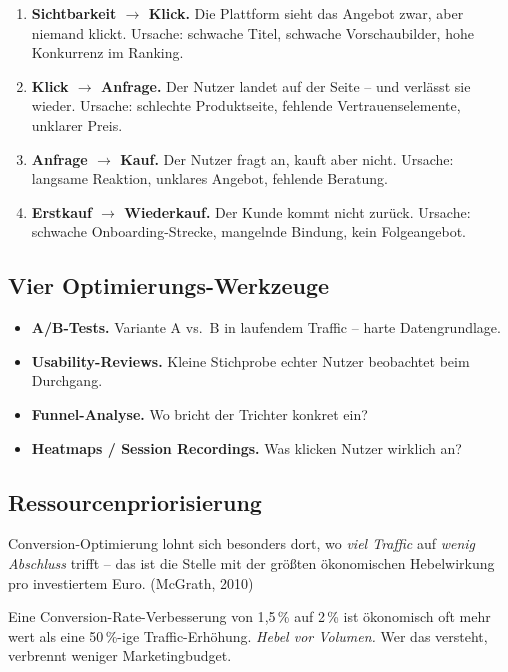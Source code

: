 \documentclass[11pt,a4paper,oneside]{article}
\newcommand{\caveatfontfallback}{\itshape}
\newcommand\caveatfont{\caveatfontfallback}%
\newcommand{\akzent}[1]{{\caveatfont\color{lpAmber}#1}}
\newcommand{\quelle}[1]{{\footnotesize\color{lpGray}(#1)}}
\begin{document}
\begin{enumerate}
  \item \textbf{Sichtbarkeit $\rightarrow$ Klick.} Die Plattform sieht das Angebot zwar, aber niemand klickt. Ursache: schwache Titel, schwache Vorschaubilder, hohe Konkurrenz im Ranking.
  \item \textbf{Klick $\rightarrow$ Anfrage.} Der Nutzer landet auf der Seite -- und verlässt sie wieder. Ursache: schlechte Produktseite, fehlende Vertrauenselemente, unklarer Preis.
  \item \textbf{Anfrage $\rightarrow$ Kauf.} Der Nutzer fragt an, kauft aber nicht. Ursache: langsame Reaktion, unklares Angebot, fehlende Beratung.
  \item \textbf{Erstkauf $\rightarrow$ Wiederkauf.} Der Kunde kommt nicht zurück. Ursache: schwache Onboarding-Strecke, mangelnde Bindung, kein Folgeangebot.
\end{enumerate}

\subsection{Vier Optimierungs-Werkzeuge}

\begin{itemize}
  \item \textbf{A/B-Tests.} Variante A vs.\ B in laufendem Traffic -- harte Datengrundlage.
  \item \textbf{Usability-Reviews.} Kleine Stichprobe echter Nutzer beobachtet beim Durchgang.
  \item \textbf{Funnel-Analyse.} Wo bricht der Trichter konkret ein?
  \item \textbf{Heatmaps / Session Recordings.} Was klicken Nutzer wirklich an?
\end{itemize}

\subsection{Ressourcenpriorisierung}

Conversion-Optimierung lohnt sich besonders dort, wo \emph{viel Traffic} auf \emph{wenig Abschluss} trifft -- das ist die Stelle mit der größten ökonomischen Hebelwirkung pro investiertem Euro. \quelle{McGrath, 2010}

\begin{eselsbox}[Eselsbrücke: \akzent{Hebel vor Volumen}]
Eine Conversion-Rate-Verbesserung von 1{,}5\,\% auf 2\,\% ist ökonomisch oft mehr wert als eine 50\,\%-ige Traffic-Erhöhung. \emph{Hebel vor Volumen.} Wer das versteht, verbrennt weniger Marketingbudget.
\end{eselsbox}
\end{document}
